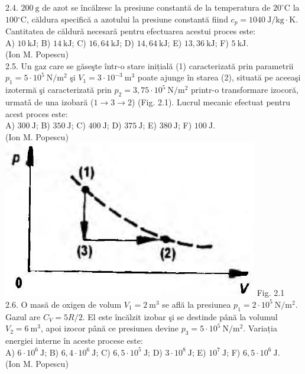 2.4. $200 \mathrm{~g}$ de azot se încălzesc la presiune constantă de la temperatura de $20^{\circ} \mathrm{C}$ la $100{ }^{\circ} \mathrm{C}$, căldura specifică a azotului la presiune constantă fiind $c_{p}=1040 \mathrm{~J} / \mathrm{kg} \cdot \mathrm{K}$. Cantitatea de căldură necesară pentru efectuarea acestui proces este:\\ A) $10 \mathrm{~kJ}$; B) $14 \mathrm{~kJ}$; C) $16,64 \mathrm{~kJ}$; D) $14,64 \mathrm{~kJ}$; E) $13,36 \mathrm{~kJ}$; F) $5 \mathrm{~kJ}$.\\ (Ion M. Popescu)\\

2.5. Un gaz care se găseşte într-o stare inițială (1) caracterizată prin parametrii $p_{1}=5 \cdot 10^{5} \mathrm{~N} / \mathrm{m}^{2}$ şi $V_{1}=3 \cdot 10^{-3} \mathrm{~m}^{3}$ poate ajunge în starea (2), situată pe aceeaşi izotermă şi caracterizată prin $p_{2}=3,75 \cdot 10^{5} \mathrm{~N} / \mathrm{m}^{2}$ printr-o transformare izocoră, urmatǎ de una izobară ($1 \rightarrow 3 \rightarrow 2$) (Fig. 2.1). Lucrul mecanic efectuat pentru acest proces este:\\ A) $300 \mathrm{~J}$; B) $350 \mathrm{~J}$; C) $400 \mathrm{~J}$; D) $375 \mathrm{~J}$; E) $380 \mathrm{~J}$; F) $100 \mathrm{~J}$.\\ (Ion M. Popescu)\\ \includegraphics[width=0.4\linewidth]{images/2025_07_01_5b3ff9fa0d508c8e9f17g-074} Fig. 2.1\\

2.6. O masă de oxigen de volum $V_{1}=2 \mathrm{~m}^{3}$ se află la presiunea $p_{1}=2 \cdot 10^{5} \mathrm{~N} / \mathrm{m}^{2}$. Gazul are $C_{V}=5 R / 2$. El este încălzit izobar şi se destinde până la volumul $V_{2}=6 \mathrm{~m}^{3}$, apoi izocor până ce presiunea devine $p_{3}=5 \cdot 10^{5} \mathrm{~N} / \mathrm{m}^{2}$. Variația energiei interne în aceste procese este:\\ A) $6 \cdot 10^{6} \mathrm{~J}$; B) $6,4 \cdot 10^{6} \mathrm{~J}$; C) $6,5 \cdot 10^{5} \mathrm{~J}$; D) $3 \cdot 10^{8} \mathrm{~J}$; E) $10^{7} \mathrm{~J}$; F) $6,5 \cdot 10^{6} \mathrm{~J}$.\\ (Ion M. Popescu)\\

